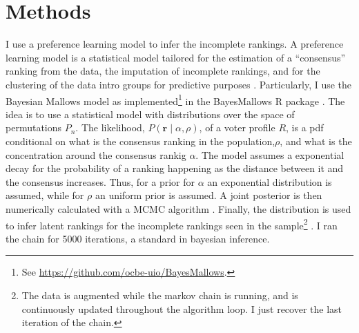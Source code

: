 \documentclass[hidelinks,11pt]{article}
\begin{document}
\begin{table}[]\centering
{}
\caption{Frequency of pairwise comparisons in the dataset.}

\label{Tab:Tcpairwise}
\end{table}


\section{Methods}

I use a preference learning model to infer the incomplete rankings. A preference learning model is a statistical model tailored for the estimation of a ``consensus'' ranking from the data, the imputation of incomplete rankings, and for the clustering of the data intro groups for predictive purposes \parencite{liu2019model}. Particularly, I use the Bayesian Mallows model as implemented\footnote{See \url{https://github.com/ocbe-uio/BayesMallows}.} in the BayesMallows R package \parencite{sorensen2019bayesmallows, lu2011learning}. The idea is to use a statistical model with distributions over the space of permutations \(P_{n}\). The likelihood, \(P(\mathbf{r} \mid \alpha, \rho)\), of a voter profile \(R\), is a pdf conditional on what is the consensus ranking in the population,\(\rho\), and what is the concentration around the consensus rankig \(\alpha\). The model assumes a exponential decay for the probability of a ranking happening as the distance between it and the consensus increases. Thus, for a prior for \(\alpha\) an exponential distribution is assumed, while for \(\rho\) an uniform prior is assumed. A joint posterior is then numerically calculated with a MCMC algorithm \parencite{sorensen2019bayesmallows}. Finally, the distribution is used to infer latent rankings for the incomplete rankings seen in the sample\footnote{The data is augmented while the markov chain is running, and is continuously updated throughout the algorithm loop. I just recover the last iteration of the chain.} \parencite{sorensen2019bayesmallows}. I ran the chain for 5000 iterations, a standard in bayesian inference.
\end{document}
